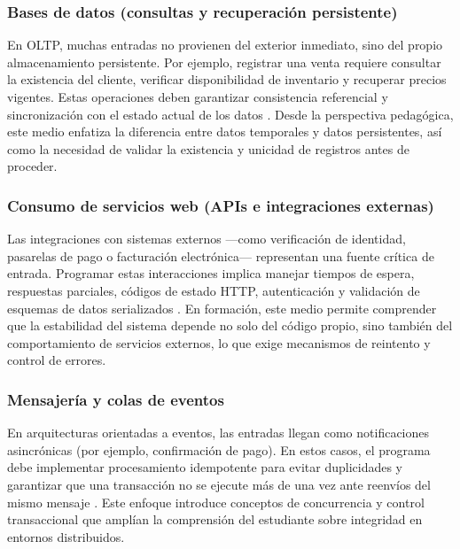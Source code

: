 \documentclass[12pt,twoside]{book}
\begin{document}
					\subsubsection{Bases de datos (consultas y recuperación persistente)}
						\noindent
						En OLTP, muchas entradas no provienen del exterior inmediato, sino del propio almacenamiento persistente. Por ejemplo, registrar una venta requiere consultar la existencia del cliente, verificar disponibilidad de inventario y recuperar precios vigentes. Estas operaciones deben garantizar consistencia referencial y sincronización con el estado actual de los datos \cite{Silberschatz2020Database,Date2019Database,Elmasri2016Database}. Desde la perspectiva pedagógica, este medio enfatiza la diferencia entre datos temporales y datos persistentes, así como la necesidad de validar la existencia y unicidad de registros antes de proceder.
						
					\subsubsection{Consumo de servicios web (APIs e integraciones externas)}
					\noindent
						Las integraciones con sistemas externos —como verificación de identidad, pasarelas de pago o facturación electrónica— representan una fuente crítica de entrada. Programar estas interacciones implica manejar tiempos de espera, respuestas parciales, códigos de estado HTTP, autenticación y validación de esquemas de datos serializados \cite{Fielding2000REST,Pressman2019Software,Sommerville2015Software}. En formación, este medio permite comprender que la estabilidad del sistema depende no solo del código propio, sino también del comportamiento de servicios externos, lo que exige mecanismos de reintento y control de errores.
						
					\subsubsection{Mensajería y colas de eventos}
						\noindent
						En arquitecturas orientadas a eventos, las entradas llegan como notificaciones asincrónicas (por ejemplo, confirmación de pago). En estos casos, el programa debe implementar procesamiento idempotente para evitar duplicidades y garantizar que una transacción no se ejecute más de una vez ante reenvíos del mismo mensaje \cite{ISO247722024Programming,Date2019Database,Sommerville2015Software}. Este enfoque introduce conceptos de concurrencia y control transaccional que amplían la comprensión del estudiante sobre integridad en entornos distribuidos.
						
\end{document}
